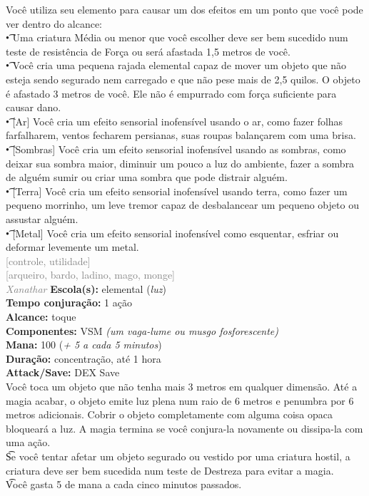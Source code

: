 \documentclass{RPG_Adventure}[2021/10/20]
\begin{document}
{\normalsize Você utiliza seu elemento para causar um dos efeitos em um ponto que você pode ver dentro do alcance:\\\t • Uma criatura Média ou menor que você escolher deve ser bem sucedido num teste de resistência de Força ou será afastada 1,5 metros de você.\\\t • Você cria uma pequena rajada elemental capaz de mover um objeto que não esteja sendo segurado nem carregado e que não pese mais de 2,5 quilos. O objeto é afastado 3 metros de você. Ele não é empurrado com força suficiente para causar dano.\\\t • [Ar] Você cria um efeito sensorial inofensível usando o ar, como fazer folhas farfalharem, ventos fecharem persianas, suas roupas balançarem com uma brisa.\\\t • [Sombras] Você cria um efeito sensorial inofensível usando as sombras, como deixar sua sombra maior, diminuir um pouco a luz do ambiente, fazer a sombra de alguém sumir ou criar uma sombra que pode distrair alguém.\\\t • [Terra] Você cria um efeito sensorial inofensível usando terra, como fazer um pequeno morrinho, um leve tremor capaz de desbalancear um pequeno objeto ou assustar alguém.\\\t • [Metal] Você cria um efeito sensorial inofensível como esquentar, esfriar ou deformar levemente um metal.\\}
{\scriptsize \textcolor{gray}{[controle, utilidade]\\}}
{\scriptsize \textcolor{gray}{[arqueiro, bardo, ladino, mago, monge]\\}}
{\tiny \textcolor{gray}{\textit{Xanathar}}}
{\small \t \textbf{Escola(s):} elemental (\textit{luz})\\\t \textbf{Tempo conjuração:} 1 ação\\\t \textbf{Alcance:} toque\\\t \textbf{Componentes:} VSM \textit{(um vaga-lume ou musgo fosforescente)}\\\t \textbf{Mana:} 100 (\textit{+ 5 a cada 5 minutos})\\\t \textbf{Duração:} concentração, até 1 hora\\\t \textbf{Attack/Save:} DEX Save\\}
{\normalsize Você toca um objeto que não tenha mais 3 metros em qualquer dimensão. Até a magia acabar, o objeto emite luz plena num raio de 6 metros e penumbra por 6 metros adicionais. Cobrir o objeto completamente com alguma coisa opaca bloqueará a luz. A magia termina se você conjura-la novamente ou dissipa-la com uma ação.\\\t Se você tentar afetar um objeto segurado ou vestido por uma criatura hostil, a criatura deve ser bem sucedida num teste de Destreza para evitar a magia.\\\t Você gasta 5 de mana a cada cinco minutos passados.\\}
\end{document}
